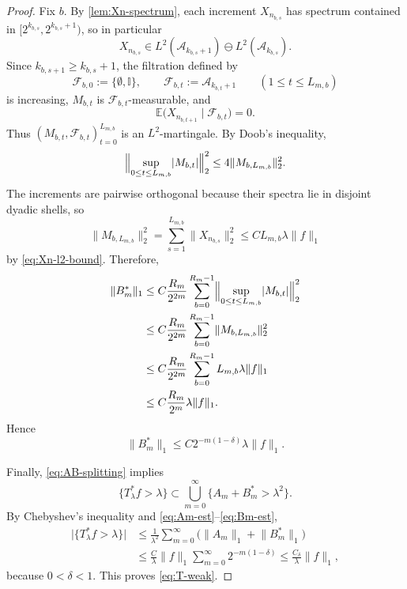 \documentclass[11pt]{amsart}
\numberwithin{equation}{section}
\theoremstyle{remark}
\begin{document}
\begin{proof}
Fix $b$. By \cref{lem:Xn-spectrum}, each increment $X_{n_{b,s}}$ has
spectrum contained in $[ 2^{k_{b,s}},2^{k_{b,s}+1}) $, so in particular 
\begin{equation*}
X_{n_{b,s}}\in L^2(\mathcal{A}_{k_{b,s}+1})\ominus L^2(\mathcal{A}%
_{k_{b,s}}). 
\end{equation*}
Since $k_{b,s+1}\ge k_{b,s}+1$, the filtration defined by 
\begin{equation*}
\mathcal{F}_{b,0}:=\{\emptyset,\mathbb{I}\}, \qquad \mathcal{F}_{b,t}:=%
\mathcal{A}_{k_{b,t}+1}\qquad (1\le t\le L_{m,b}) 
\end{equation*}
is increasing, $M_{b,t}$ is $\mathcal{F}_{b,t}$-measurable, and 
\begin{equation*}
\mathbb{E}\bigl(X_{n_{b,t+1}}\mid \mathcal{F}_{b,t}\bigr)=0. 
\end{equation*}
Thus $(M_{b,t},\mathcal{F}_{b,t})_{t=0}^{L_{m,b}}$ is an $L^2$-martingale.
By Doob's inequality, 
\begin{equation*}
\Bigl\|\sup_{0\le t\le L_{m,b}}\lvert M_{b,t}\rvert\Bigr\|_2^2 \le 4\lVert
M_{b,L_{m,b}}\rVert_2^2. 
\end{equation*}
The increments are pairwise orthogonal because their spectra lie in disjoint
dyadic shells, so 
\begin{equation*}
\lVert M_{b,L_{m,b}}\rVert_2^2 =\sum_{s=1}^{L_{m,b}}\lVert
X_{n_{b,s}}\rVert_2^2 \le C L_{m,b}\lambda\lVert f\rVert_1 
\end{equation*}
by \eqref{eq:Xn-l2-bound}. Therefore, 
\begin{align*}
\lVert B_m^*\rVert_1 &\le C\frac{R_m}{2^{2m}}\sum_{b=0}^{R_m-1} \Bigl\|%
\sup_{0\le t\le L_{m,b}}\lvert M_{b,t}\rvert\Bigr\|_2^2 \\
&\le C\frac{R_m}{2^{2m}}\sum_{b=0}^{R_m-1}\lVert M_{b,L_{m,b}}\rVert_2^2 \\
&\le C\frac{R_m}{2^{2m}}\sum_{b=0}^{R_m-1}L_{m,b}\lambda\lVert f\rVert_1 \\
&\le C\frac{R_m}{2^m}\lambda\lVert f\rVert_1.
\end{align*}
Hence 
\begin{equation}
\lVert B_m^*\rVert_1\le C2^{-m(1-\delta)}\lambda\lVert f\rVert_1.
\label{eq:Bm-est}
\end{equation}

Finally, \eqref{eq:AB-splitting} implies 
\begin{equation*}
\{T_\lambda^*f>\lambda\} \subset
\bigcup_{m=0}^{\infty}\{A_m+B_m^*>\lambda^2\}. 
\end{equation*}
By Chebyshev's inequality and \eqref{eq:Am-est}--\eqref{eq:Bm-est}, 
\begin{align*}
\lvert \{T_\lambda^*f>\lambda\}\rvert &\le
\frac1{\lambda^2}\sum_{m=0}^{\infty}\bigl(\lVert A_m\rVert_1+\lVert
B_m^*\rVert_1\bigr) \\
&\le \frac{C}{\lambda}\lVert f\rVert_1\sum_{m=0}^{\infty}2^{-m(1-\delta)}
\le \frac{C_\delta}{\lambda}\lVert f\rVert_1,
\end{align*}
because $0<\delta<1$. This proves \eqref{eq:T-weak}.
\end{proof}
\end{document}
